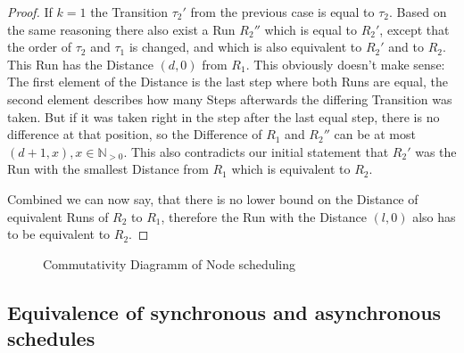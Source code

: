 \begin{proof}
If \(k = 1\) the Transition \(\tau_2'\) from the previous case is equal to \(\tau_2\).
Based on the same reasoning there also exist a Run \(R_2''\) which is equal to \(R_2'\), except that the order of \(\tau_2\) and \(\tau_1\) is changed, and which is also equivalent to \(R_2'\) and to \(R_2\).
This Run has the Distance \((d, 0)\) from \(R_1\).
This obviously doesn't make sense: The first element of the Distance is the last step where both Runs are equal, the second element describes how many Steps afterwards the differing Transition was taken.
But if it was taken right in the step after the last equal step, there is no difference at that position, so the Difference of \(R_1\) and \(R_2''\) can be at most \((d+1, x), x \in \mathbb{N}_{>0}\).
This also contradicts our initial statement that \(R_2'\) was the Run with the smallest Distance from \(R_1\) which is equivalent to \(R_2\).

Combined we can now say, that there is no lower bound on the Distance of equivalent Runs of \(R_2\) to \(R_1\), therefore the Run with the Distance \((l, 0)\) also has to be equivalent to \(R_2\).

\end{proof}


\begin{figure}
  \caption{Commutativity Diagramm of Node scheduling}
\label{fig:chap3:sec_sync:commutativity_scheduling}
\end{figure}



\subsection{Equivalence of synchronous and asynchronous schedules}
\label{sec:concepts:equivalence_without_timing:sync_async}

